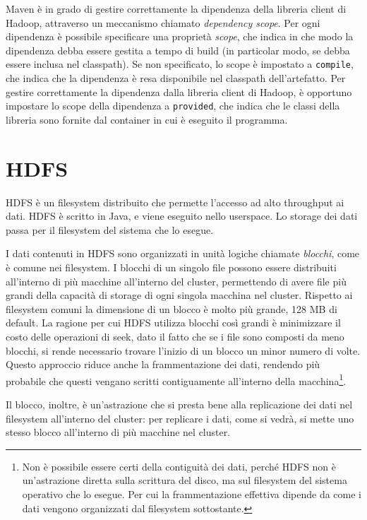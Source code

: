 \documentclass[italian,a4paper, twoside, 12pt]{report}
\begin{document}
Maven è in grado di gestire correttamente la dipendenza della libreria
client di Hadoop, attraverso un meccanismo chiamato \emph{dependency
scope}. Per ogni dipendenza è possibile specificare una proprietà
\emph{scope}, che indica in che modo la dipendenza debba essere gestita
a tempo di build (in particolar modo, se debba essere inclusa nel
classpath). Se non specificato, lo scope è impostato a \texttt{compile},
che indica che la dipendenza è resa disponibile nel classpath
dell'artefatto. Per gestire correttamente la dipendenza dalla libreria
client di Hadoop, è opportuno impostare lo scope della dipendenza a
\texttt{provided}, che indica che le classi della libreria sono fornite
dal container in cui è eseguito il programma.

\section{HDFS}\label{hdfs}

HDFS è un filesystem distribuito che permette l'accesso ad alto
throughput ai dati. HDFS è scritto in Java, e viene eseguito nello
userspace. Lo storage dei dati passa per il filesystem del sistema che
lo esegue.

I dati contenuti in HDFS sono organizzati in unità logiche chiamate
\emph{blocchi}, come è comune nei filesystem. I blocchi di un singolo
file possono essere distribuiti all'interno di più macchine all'interno
del cluster, permettendo di avere file più grandi della capacità di
storage di ogni singola macchina nel cluster. Rispetto ai filesystem
comuni la dimensione di un blocco è molto più grande, 128 MB di default.
La ragione per cui HDFS utilizza blocchi così grandi è minimizzare il
costo delle operazioni di seek, dato il fatto che se i file sono
composti da meno blocchi, si rende necessario trovare l'inizio di un
blocco un minor numero di volte. Questo approccio riduce anche la
frammentazione dei dati, rendendo più probabile che questi vengano
scritti contiguamente all'interno della macchina\footnote{Non è
  possibile essere certi della contiguità dei dati, perché HDFS non è
  un'astrazione diretta sulla scrittura del disco, ma sul filesystem del
  sistema operativo che lo esegue. Per cui la frammentazione effettiva
  dipende da come i dati vengono organizzati dal filesystem sottostante.}.

Il blocco, inoltre, è un'astrazione che si presta bene alla replicazione
dei dati nel filesystem all'interno del cluster: per replicare i dati,
come si vedrà, si mette uno stesso blocco all'interno di più macchine
nel cluster.
\end{document}
